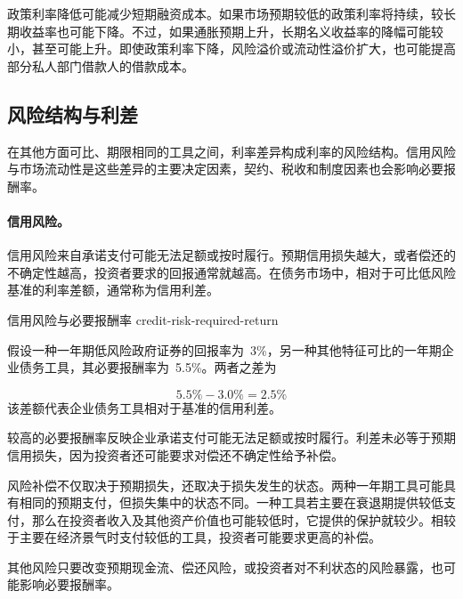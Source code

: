 政策利率降低可能减少短期融资成本。如果市场预期较低的政策利率将持续，较长期收益率也可能下降。不过，如果通胀预期上升，长期名义收益率的降幅可能较小，甚至可能上升。即使政策利率下降，风险溢价或流动性溢价扩大，也可能提高部分私人部门借款人的借款成本。

\subsection{风险结构与利差}

在其他方面可比、期限相同的工具之间，利率差异构成利率的风险结构。信用风险与市场流动性是这些差异的主要决定因素，契约、税收和制度因素也会影响必要报酬率。

\paragraph{信用风险。}

信用风险来自承诺支付可能无法足额或按时履行。预期信用损失越大，或者偿还的不确定性越高，投资者要求的回报通常就越高。在债务市场中，相对于可比低风险基准的利率差额，通常称为信用利差。

\begin{example}{信用风险与必要报酬率} {credit-risk-required-return}

假设一种一年期低风险政府证券的回报率为~3\%，另一种其他特征可比的一年期企业债务工具，其必要报酬率为~5.5\%。两者之差为

\[
5.5\%-3.0\%=2.5\%
\]
该差额代表企业债务工具相对于基准的信用利差。

较高的必要报酬率反映企业承诺支付可能无法足额或按时履行。利差未必等于预期信用损失，因为投资者还可能要求对偿还不确定性给予补偿。

\end{example}

风险补偿不仅取决于预期损失，还取决于损失发生的状态。两种一年期工具可能具有相同的预期支付，但损失集中的状态不同。一种工具若主要在衰退期提供较低支付，那么在投资者收入及其他资产价值也可能较低时，它提供的保护就较少。相较于主要在经济景气时支付较低的工具，投资者可能要求更高的补偿。

其他风险只要改变预期现金流、偿还风险，或投资者对不利状态的风险暴露，也可能影响必要报酬率。

